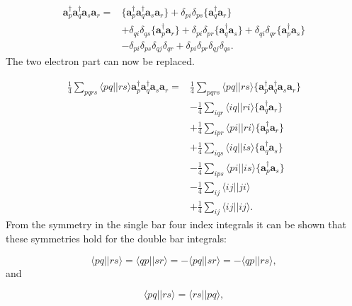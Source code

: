 \documentclass[graybox,sectrefs,envcountresetchap,open=right]{svmonodo}
\begin{document}
\begin{align}
\mathbf{a}^{\dagger}_p \mathbf{a}^{\dagger}_q \mathbf{a}_s \mathbf{a}_r = &\{\mathbf{a}^{\dagger}_p \mathbf{a}^{\dagger}_q \mathbf{a}_s \mathbf{a}_r\} 
+ \delta_{pi} \delta_{ps} \{ \mathbf{a}^{\dagger}_q \mathbf{a}_r \}
\nonumber \\ & 
+ \delta_{qi} \delta_{qs}
\{ \mathbf{a}^{\dagger}_p \mathbf{a}_r \}
+ \delta_{pi} \delta_{pr} 
\{ \mathbf{a}^{\dagger}_q \mathbf{a}_s \}
+ \delta_{qi} \delta_{qr}
\{ \mathbf{a}^{\dagger}_p \mathbf{a}_s \} \nonumber \\ &
- \delta_{pi} \delta_{ps} \delta_{qj} \delta_{qr}
+ \delta_{pi} \delta_{pr} \delta_{qj} \delta_{qs} .
\end{align} 
The two electron part can now be replaced.

\begin{align}
\frac{1}{4} \sum_{pqrs} \langle pq||rs \rangle \mathbf{a}^{\dagger}_p \mathbf{a}^{\dagger}_q \mathbf{a}_s \mathbf{a}_r = &
\frac{1}{4}
\sum_{pqrs} \langle pq||rs \rangle \{\mathbf{a}^{\dagger}_p \mathbf{a}^{\dagger}_q \mathbf{a}_s \mathbf{a}_r\}
\nonumber \\ &
- \frac{1}{4} \sum_{iqr} \langle iq||ri \rangle \{\mathbf{a}^{\dagger}_q \mathbf{a}_r \} \nonumber \\ &
+ \frac{1}{4} \sum_{ipr} \langle pi||ri \rangle \{\mathbf{a}^{\dagger}_p \mathbf{a}_r \} \nonumber \\ &
+ \frac{1}{4} \sum_{iqs} \langle iq||is \rangle \{\mathbf{a}^{\dagger}_q \mathbf{a}_s \} \nonumber \\ &
- \frac{1}{4} \sum_{ips} \langle pi||is \rangle \{\mathbf{a}^{\dagger}_p \mathbf{a}_s \} \nonumber \\ &
- \frac{1}{4} \sum_{ij} \langle ij||ji \rangle \nonumber \\ &
+ \frac{1}{4} \sum_{ij} \langle ij||ij \rangle . \nonumber
\end{align} 
From the symmetry in the single bar four index integrals it can be shown that these symmetries hold for the double bar integrals:

\begin{equation}
\langle pq||rs \rangle =
\langle qp||sr \rangle =
- \langle pq||sr \rangle =
- \langle qp || rs \rangle , \label{dirac_symetry}
\end{equation} 
and 

\begin{equation}
\langle pq || rs \rangle = \langle rs || pq \rangle ,
\end{equation} 
\end{document}
